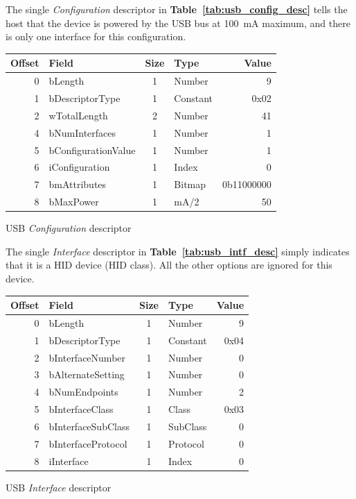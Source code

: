 \documentclass[a4paper,10pt]{article}
\makeatletter
\newenvironment{tablehere}{\def\@captype{table}\vspace{2ex}}{\vspace{2ex}}
\newcommand{\citet}[1]{\textbf{Table~\ref{#1}}}
\makeatother
\begin{document}
\begin{multicols}{2}
The single \emph{Configuration} descriptor in \citet{tab:usb_config_desc}
tells the host that the device is powered by the USB bus at 100~mA maximum,
and there is only one interface for this configuration.

\begin{tablehere}
\centering \footnotesize
\begin{tabular}{|r|l|c|l|r|}
\hline
\textbf{Offset} & \textbf{Field} & \textbf{Size} & \textbf{Type} & \textbf{Value}	\\
\hline
0	& bLength				& 1	& Number	& 9				\\
1	& bDescriptorType		& 1	& Constant	& 0x02			\\
2	& wTotalLength			& 2	& Number	& 41			\\
4	& bNumInterfaces		& 1	& Number	& 1				\\
5	& bConfigurationValue	& 1	& Number	& 1				\\
6	& iConfiguration		& 1	& Index		& 0				\\
7	& bmAttributes			& 1	& Bitmap	& 0b11000000	\\
8	& bMaxPower				& 1	& mA/2		& 50			\\
\hline
\end{tabular}
\caption{USB \emph{Configuration} descriptor}
\label{tab:usb_config_desc}
\end{tablehere}

The single \emph{Interface} descriptor in \citet{tab:usb_intf_desc} simply
indicates that it is a HID device (HID class). All the other options are
ignored for this device.

\begin{tablehere}
\centering \footnotesize
\begin{tabular}{|r|l|c|l|r|}
\hline
\textbf{Offset} & \textbf{Field} & \textbf{Size} & \textbf{Type} & \textbf{Value}	\\
\hline
0	& bLength				& 1	& Number	& 9			\\
1	& bDescriptorType		& 1	& Constant	& 0x04		\\
2	& bInterfaceNumber		& 1	& Number	& 0			\\
3	& bAlternateSetting		& 1	& Number	& 0			\\
4	& bNumEndpoints			& 1	& Number	& 2			\\
5	& bInterfaceClass		& 1	& Class		& 0x03		\\
6	& bInterfaceSubClass	& 1	& SubClass	& 0			\\
7	& bInterfaceProtocol	& 1	& Protocol	& 0			\\
8	& iInterface			& 1	& Index		& 0			\\
\hline
\end{tabular}
\caption{USB \emph{Interface} descriptor}
\label{tab:usb_intf_desc}
\end{tablehere}


\end{multicols}
\end{document}
